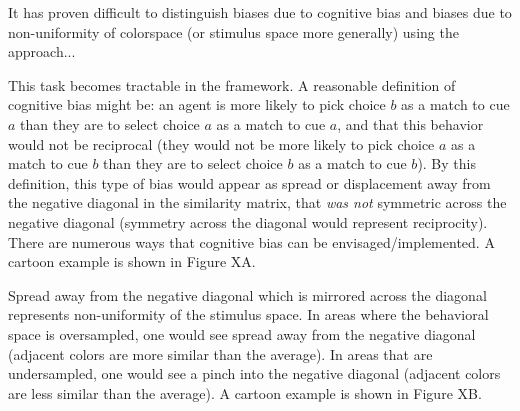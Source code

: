 It has proven difficult to distinguish biases due to cognitive bias and biases due to non-uniformity of colorspace (or stimulus space more generally) using the  approach... %

This task becomes tractable in the  framework.
A reasonable definition of cognitive bias might be: an agent is more likely to pick choice $b$ as a match to cue $a$ than they are to select choice $a$ as a match to cue $a$, and that this behavior would not be reciprocal (they would not be more likely to pick choice $a$ as a match to cue $b$ than they are to select choice $b$ as a match to cue $b$).
By this definition, this type of bias would appear as spread or displacement away from the negative diagonal in the similarity matrix, that \emph{was not} symmetric across the negative diagonal (symmetry across the diagonal would represent reciprocity).
There are numerous ways that cognitive bias can be envisaged/implemented.
A cartoon example is shown in Figure XA.

Spread away from the negative diagonal which is mirrored across the diagonal represents non-uniformity of the stimulus space.
In areas where the behavioral space is oversampled, one would see spread away from the negative diagonal (adjacent colors are more similar than the average).
In areas that are undersampled, one would see a pinch into the negative diagonal (adjacent colors are less similar than the average).
A cartoon example is shown in Figure XB.

